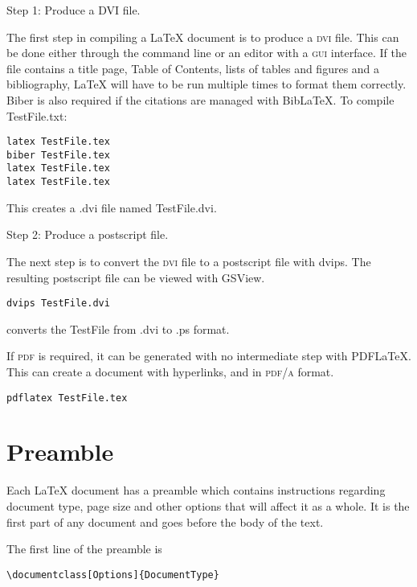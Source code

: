 \documentclass[a4paper]{article}
\begin{document}
Step 1: Produce a DVI file.

The first step in compiling a LaTeX document is to produce a \textsc{dvi} file. This can be done either through the command line or an editor with a \textsc{gui} interface. If the file contains a title page, Table of Contents, lists of tables and figures and a bibliography, LaTeX will have to be run multiple times to format them correctly. Biber is also required if the citations are managed with BibLaTeX. To compile TestFile.txt:


\begin{verbatim}
latex TestFile.tex
biber TestFile.tex
latex TestFile.tex
latex TestFile.tex
\end{verbatim}

This creates a .dvi file named TestFile.dvi.

Step 2: Produce a postscript file.

The next step is to convert the \textsc{dvi} file to a postscript file with dvips. The resulting postscript file can be viewed with GSView. 

\begin{verbatim}
dvips TestFile.dvi
\end{verbatim}

converts the TestFile from .dvi to .ps format.

If \textsc{pdf} is required, it can be generated with no intermediate step with PDFLaTeX. This can create a document with hyperlinks, and in \textsc{pdf/a} format.

\begin{verbatim}
pdflatex TestFile.tex
\end{verbatim}


\clearpage





\section{Preamble}


Each LaTeX document has a preamble which contains instructions regarding document type, page size and other options that will affect it as a whole. It is the first part of any document and goes before the body of the text.

The first line of the preamble is

\begin{verbatim}
\documentclass[Options]{DocumentType}
\end{verbatim}
\end{document}
